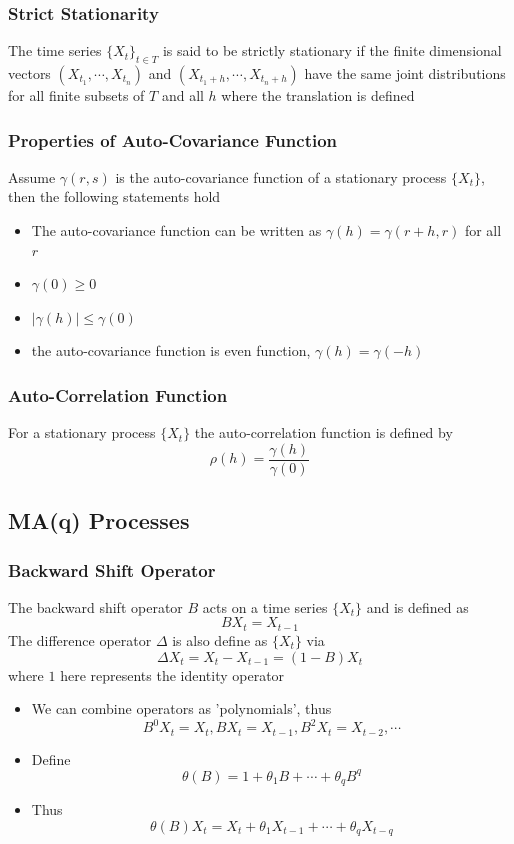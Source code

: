 \documentclass[11pt]{article}
\begin{document}
\subsubsection{Strict Stationarity}
The time series $\{X_t\}_{t\in T}$ is said to be strictly stationary if the finite dimensional vectors $(X_{t_1},\cdots,X_{t_n})$ and $(X_{t_1+h},\cdots,X_{t_n+h})$
have the same joint distributions for all finite subsets of $T$ and all $h$ where the translation is defined 
\subsubsection{Properties of Auto-Covariance Function}
Assume $\gamma(r,s)$ is the auto-covariance function of a stationary process $\{X_t\}$, then the following statements hold 
\begin{itemize}
    \item The auto-covariance function can be written as $\gamma(h)=\gamma(r+h, r)$ for all $r$
    \item $\gamma(0)\geq 0$
    \item $|\gamma(h)|\leq \gamma(0)$
    \item the auto-covariance function is even function, $\gamma(h) = \gamma(-h)$
\end{itemize}
\subsubsection{Auto-Correlation Function}
For a stationary process $\{X_t\}$ the auto-correlation function is defined by 
\[\rho(h) = \dfrac{\gamma(h)}{\gamma(0)}\]   
\subsection{MA(q) Processes}
\subsubsection{Backward Shift Operator}
The backward shift operator $B$ acts on a time series $\{X_t\}$ and is defined as \[BX_t = X_{t-1}\]   
The difference operator $\Delta$ is also define as $\{X_t\}$ via 
\[\Delta X_t = X_t-X_{t-1} = (1-B)X_t\] where $1$ here represents the identity operator 
\begin{itemize}
    \item We can combine operators as 'polynomials', thus 
    \[B^0X_t = X_t, BX_t = X_{t-1}, B^2X_t = X_{t-2},\cdots\]
    \item Define \[\theta(B)=1+\theta_1B+\cdots+\theta_qB^q\]    
    \item Thus \[\theta(B)X_t = X_t+\theta_1X_{t-1}+\cdots+\theta_qX_{t-q}\]
\end{itemize}
\end{document}
